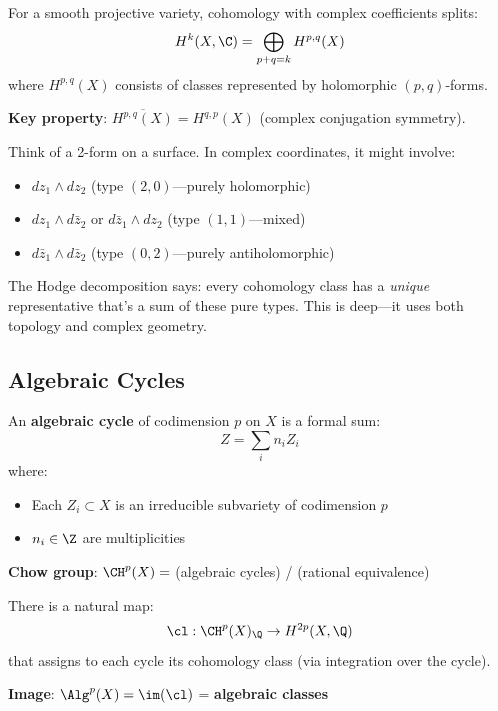 \begin{defn}\label{def:hodge-decomposition}
For a smooth projective variety, cohomology with complex coefficients splits:
\begin{equation}
H^k(X, \C) = \bigoplus_{p+q=k} H^{p,q}(X)
\end{equation}
where $H^{p,q}(X)$ consists of classes represented by holomorphic $(p,q)$-forms.

\textbf{Key property}: $\overline{H^{p,q}(X)} = H^{q,p}(X)$ (complex conjugation symmetry).
\end{defn}

\begin{intuitive}
Think of a 2-form on a surface. In complex coordinates, it might involve:
\begin{itemize}
\item $dz_1 \wedge dz_2$ (type $(2,0)$—purely holomorphic)
\item $dz_1 \wedge d\bar{z}_2$ or $d\bar{z}_1 \wedge dz_2$ (type $(1,1)$—mixed)
\item $d\bar{z}_1 \wedge d\bar{z}_2$ (type $(0,2)$—purely antiholomorphic)
\end{itemize}

The Hodge decomposition says: every cohomology class has a \textit{unique} representative that's a sum of these pure types. This is deep—it uses both topology and complex geometry.
\end{intuitive}

\subsection{Algebraic Cycles}

\begin{defn}\label{def:algebraic-cycles}
An \textbf{algebraic cycle} of codimension $p$ on $X$ is a formal sum:
\begin{equation}
Z = \sum_{i} n_i Z_i
\end{equation}
where:
\begin{itemize}
\item Each $Z_i \subset X$ is an irreducible subvariety of codimension $p$
\item $n_i \in \Z$ are multiplicities
\end{itemize}

\textbf{Chow group}: $\CH^p(X) = $ (algebraic cycles) / (rational equivalence)
\end{defn}

\begin{defn}\label{def:cycle-class-map}
There is a natural map:
\begin{equation}
\cl: \CH^p(X)_\Q \to H^{2p}(X, \Q)
\end{equation}
that assigns to each cycle its cohomology class (via integration over the cycle).

\textbf{Image}: $\Alg^p(X) = \im(\cl)$ = \textbf{algebraic classes}
\end{defn}

